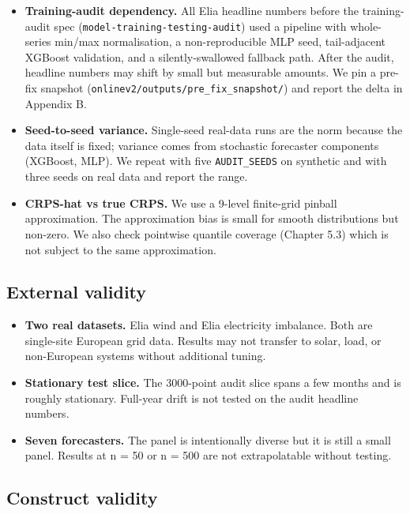 \documentclass[11pt,a4paper,openany]{report}
\begin{document}
\begin{itemize}
  \item \textbf{Training-audit dependency.} All Elia headline numbers before the
    training-audit spec (\texttt{model-training-testing-audit}) used a pipeline
    with whole-series min/max normalisation, a non-reproducible MLP
    seed, tail-adjacent XGBoost validation, and a silently-swallowed
    fallback path. After the audit, headline numbers may shift by small
    but measurable amounts. We pin a pre-fix snapshot
    (\texttt{onlinev2/outputs/pre\_fix\_snapshot/}) and report the delta in
    Appendix B.
  \item \textbf{Seed-to-seed variance.} Single-seed real-data runs are the norm
    because the data itself is fixed; variance comes from stochastic
    forecaster components (XGBoost, MLP). We repeat with five
    \texttt{AUDIT\_SEEDS} on synthetic and with three seeds on real data and
    report the range.
  \item \textbf{CRPS-hat vs true CRPS.} We use a 9-level finite-grid pinball
    approximation. The approximation bias is small for smooth
    distributions but non-zero. We also check pointwise quantile
    coverage (Chapter 5.3) which is not subject to the same
    approximation.
\end{itemize}

\subsection{External validity}

\begin{itemize}
  \item \textbf{Two real datasets.} Elia wind and Elia electricity imbalance.
    Both are single-site European grid data. Results may not transfer
    to solar, load, or non-European systems without additional tuning.
  \item \textbf{Stationary test slice.} The 3000-point audit slice spans a few
    months and is roughly stationary. Full-year drift is not tested on
    the audit headline numbers.
  \item \textbf{Seven forecasters.} The panel is intentionally diverse but it is
    still a small panel. Results at n = 50 or n = 500 are not
    extrapolatable without testing.
\end{itemize}

\subsection{Construct validity}
\end{document}

